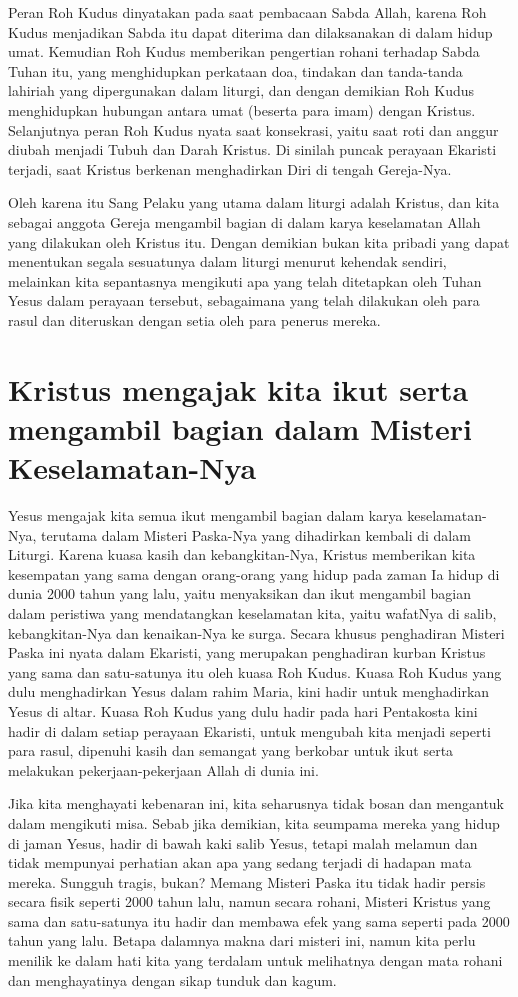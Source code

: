 Peran Roh Kudus dinyatakan pada saat pembacaan Sabda Allah, karena Roh Kudus menjadikan Sabda itu dapat diterima dan dilaksanakan di dalam hidup umat. Kemudian Roh Kudus memberikan pengertian rohani terhadap Sabda Tuhan itu, yang menghidupkan perkataan doa, tindakan dan tanda-tanda lahiriah yang dipergunakan dalam liturgi, dan dengan demikian Roh Kudus menghidupkan hubungan antara umat (beserta para imam) dengan Kristus. Selanjutnya peran Roh Kudus nyata saat konsekrasi, yaitu saat roti dan anggur diubah menjadi Tubuh dan Darah Kristus. Di sinilah puncak perayaan Ekaristi terjadi, saat Kristus berkenan menghadirkan Diri di tengah Gereja-Nya.

Oleh karena itu Sang Pelaku yang utama dalam liturgi adalah Kristus, dan kita sebagai anggota Gereja mengambil bagian di dalam karya keselamatan Allah yang dilakukan oleh Kristus itu. Dengan demikian bukan kita pribadi yang dapat menentukan segala sesuatunya dalam liturgi menurut kehendak sendiri, melainkan kita sepantasnya mengikuti apa yang telah ditetapkan oleh Tuhan Yesus dalam perayaan tersebut, sebagaimana yang telah dilakukan oleh para rasul dan diteruskan dengan setia oleh para penerus mereka.

\section*{Kristus mengajak kita ikut serta mengambil bagian dalam Misteri Keselamatan-Nya}

Yesus mengajak kita semua ikut mengambil bagian dalam karya keselamatan-Nya, terutama dalam Misteri Paska-Nya yang dihadirkan kembali di dalam Liturgi. Karena kuasa kasih dan kebangkitan-Nya, Kristus memberikan kita kesempatan yang sama dengan orang-orang yang hidup pada zaman Ia hidup di dunia 2000 tahun yang lalu, yaitu menyaksikan dan ikut mengambil bagian dalam peristiwa yang mendatangkan keselamatan kita, yaitu wafatNya di salib, kebangkitan-Nya dan kenaikan-Nya ke surga. Secara khusus penghadiran Misteri Paska ini nyata dalam Ekaristi, yang merupakan penghadiran kurban Kristus yang sama dan satu-satunya itu oleh kuasa Roh Kudus. Kuasa Roh Kudus yang dulu menghadirkan Yesus dalam rahim Maria, kini hadir untuk menghadirkan Yesus di altar. Kuasa Roh Kudus yang dulu hadir pada hari Pentakosta kini hadir di dalam setiap perayaan Ekaristi, untuk mengubah kita menjadi seperti para rasul, dipenuhi kasih dan semangat yang berkobar untuk ikut serta melakukan pekerjaan-pekerjaan Allah di dunia ini.

Jika kita menghayati kebenaran ini, kita seharusnya tidak bosan dan mengantuk dalam mengikuti misa. Sebab jika demikian, kita seumpama mereka yang hidup di jaman Yesus, hadir di bawah kaki salib Yesus, tetapi malah melamun dan tidak mempunyai perhatian akan apa yang sedang terjadi di hadapan mata mereka. Sungguh tragis, bukan? Memang Misteri Paska itu tidak hadir persis secara fisik seperti 2000 tahun lalu, namun secara rohani, Misteri Kristus yang sama dan satu-satunya itu hadir dan membawa efek yang sama seperti pada 2000 tahun yang lalu. Betapa dalamnya makna dari misteri ini, namun kita perlu menilik ke dalam hati kita yang terdalam untuk melihatnya dengan mata rohani dan menghayatinya dengan sikap tunduk dan kagum.

